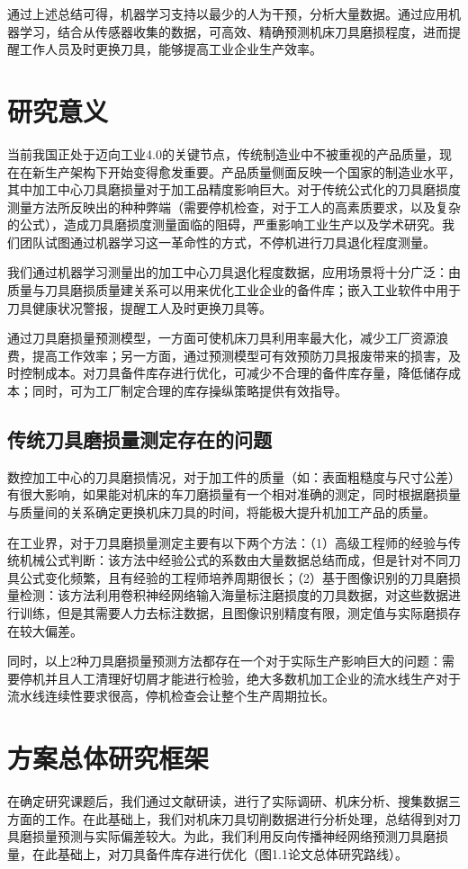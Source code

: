 通过上述总结可得，机器学习支持以最少的人为干预，分析大量数据。通过应用机器学习，结合从传感器收集的数据，可高效、精确预测机床刀具磨损程度，进而提醒工作人员及时更换刀具，能够提高工业企业生产效率。\par
\newpage
\section{研究意义}
当前我国正处于迈向工业4.0的关键节点，传统制造业中不被重视的产品质量，现在在新生产架构下开始变得愈发重要。产品质量侧面反映一个国家的制造业水平，其中加工中心刀具磨损量对于加工品精度影响巨大。对于传统公式化的刀具磨损度测量方法所反映出的种种弊端（需要停机检查，对于工人的高素质要求，以及复杂的公式），造成刀具磨损度测量面临的阻碍，严重影响工业生产以及学术研究。我们团队试图通过机器学习这一革命性的方式，不停机进行刀具退化程度测量。 \par
我们通过机器学习测量出的加工中心刀具退化程度数据，应用场景将十分广泛：由质量与刀具磨损质量建关系可以用来优化工业企业的备件库；嵌入工业软件中用于刀具健康状况警报，提醒工人及时更换刀具等。\par
通过刀具磨损量预测模型，一方面可使机床刀具利用率最大化，减少工厂资源浪费，提高工作效率；另一方面，通过预测模型可有效预防刀具报废带来的损害，及时控制成本。对刀具备件库存进行优化，可减少不合理的备件库存量，降低储存成本；同时，可为工厂制定合理的库存操纵策略提供有效指导。\par
% 
% 
\subsection{传统刀具磨损量测定存在的问题}
数控加工中心的刀具磨损情况，对于加工件的质量（如：表面粗糙度与尺寸公差）有很大影响，如果能对机床的车刀磨损量有一个相对准确的测定，同时根据磨损量与质量间的关系确定更换机床刀具的时间，将能极大提升机加工产品的质量。\par
在工业界，对于刀具磨损量测定主要有以下两个方法：（1）高级工程师的经验与传统机械公式判断：该方法中经验公式的系数由大量数据总结而成，但是针对不同刀具公式变化频繁，且有经验的工程师培养周期很长；（2）基于图像识别的刀具磨损量检测：该方法利用卷积神经网络输入海量标注磨损度的刀具数据，对这些数据进行训练，但是其需要人力去标注数据，且图像识别精度有限，测定值与实际磨损存在较大偏差。\par
同时，以上2种刀具磨损量预测方法都存在一个对于实际生产影响巨大的问题：需要停机并且人工清理好切屑才能进行检验，绝大多数机加工企业的流水线生产对于流水线连续性要求很高，停机检查会让整个生产周期拉长。\par
% 
\section{方案总体研究框架}
在确定研究课题后，我们通过文献研读，进行了实际调研、机床分析、搜集数据三方面的工作。在此基础上，我们对机床刀具切削数据进行分析处理，总结得到对刀具磨损量预测与实际偏差较大。为此，我们利用反向传播神经网络预测刀具磨损量，在此基础上，对刀具备件库存进行优化（图1.1论文总体研究路线）。\par

